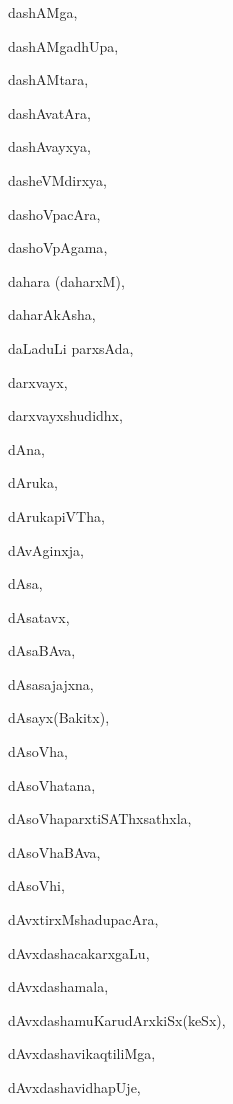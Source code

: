 \begin{multicols}{2}
{dashAMga}, \pageref{dashAMga}

{dashAMgadhUpa}, \pageref{dashAMgadhUpa}

{dashAMtara}, \pageref{dashAMtara}

{dashAvatAra}, \pageref{dashAvatAra}

{dashAvayxya}, \pageref{dashAvayxya}

{dasheVMdirxya}, \pageref{dasheVMdirxya}

{dashoVpacAra}, \pageref{dashoVpacAra}

{dashoVpAgama}, \pageref{dashoVpAgama}

{dahara (daharxM)}, \pageref{dahara daharxM}

{daharAkAsha}, \pageref{daharAkAsha}

{daLaduLi parxsAda}, \pageref{daLaduLi parxsAda}

{darxvayx}, \pageref{darxvayx}

{darxvayxshudidhx}, \pageref{darxvayxshudidhx}

{dAna}, \pageref{dAna}

{dAruka}, \pageref{dAruka}

{dArukapiVTha}, \pageref{dArukapiVTha}

{dAvAginxja}, \pageref{dAvAginxja}

{dAsa}, \pageref{dAsa}

{dAsatavx}, \pageref{dAsatavx}

{dAsaBAva}, \pageref{dAsaBAva}

{dAsasajajxna}, \pageref{dAsasajajxna}

{dAsayx(Bakitx)}, \pageref{dAsayxBakitx}

{dAsoVha}, \pageref{dAsoVha}

{dAsoVhatana}, \pageref{dAsoVhatana}

{dAsoVhaparxtiSAThxsathxla}, \pageref{dAsoVhaparxtiSAThxsathxla}

{dAsoVhaBAva}, \pageref{dAsoVhaBAva}

{dAsoVhi}, \pageref{dAsoVhi}

{dAvxtirxMshadupacAra}, \pageref{dAvxtirxMshadupacAra}

{dAvxdashacakarx\-gaLu}, \pageref{dAvxdashacakarxgaLu}

{dAvxdashamala}, \pageref{dAvxdashamala}

{dAvxdashamuKarudArxkiSx(keSx)}, \pageref{dAvxdashamuKarudArxkiSxkeSx}

{dAvxdashavikaqtiliMga}, \pageref{dAvxdashavikaqtiliMga}

{dAvxdashavidhapUje}, \pageref{dAvxdashavidhapUje}


\end{multicols}
